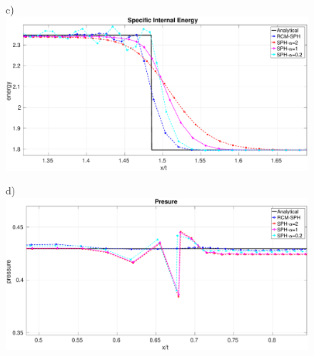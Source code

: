 \documentclass[review]{elsarticle}
\begin{document}
\begin{figure}[htp]
\begin{minipage}{.495 \textwidth}
    \end{minipage}%
    \\
    \begin{minipage}{.495 \textwidth}
        \centering c)
        \includegraphics[width=0.99 \textwidth, height=0.7\textwidth]{./Figures/Sod/RCM-Sod-SPH-alf-e-zoom}
    \end{minipage}%
    \begin{minipage}{.495\textwidth}
        \centering d)
        \includegraphics[width=0.99 \textwidth, height=0.7\textwidth]{./Figures/Sod/RCM-Sod-SPH-alf-p-zoom}

\end{minipage}
\end{figure}
\end{document}
